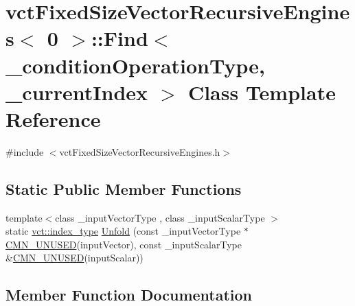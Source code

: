 \hypertarget{classvct_fixed_size_vector_recursive_engines_3_010_01_4_1_1_find}{}\section{vct\+Fixed\+Size\+Vector\+Recursive\+Engines$<$ 0 $>$\+:\+:Find$<$ \+\_\+condition\+Operation\+Type, \+\_\+current\+Index $>$ Class Template Reference}
\label{classvct_fixed_size_vector_recursive_engines_3_010_01_4_1_1_find}


{\ttfamily \#include $<$vct\+Fixed\+Size\+Vector\+Recursive\+Engines.\+h$>$}

\subsection*{Static Public Member Functions}
\begin{DoxyCompactItemize}
\item 
{\footnotesize template$<$class \+\_\+input\+Vector\+Type , class \+\_\+input\+Scalar\+Type $>$ }\\static \hyperlink{namespacevct_a50405d87494dce1f22ee3930ca285ee9}{vct\+::index\+\_\+type} \hyperlink{classvct_fixed_size_vector_recursive_engines_3_010_01_4_1_1_find_a36555789351dc612d8d924aba0640b7d}{Unfold} (const \+\_\+input\+Vector\+Type $\ast$\hyperlink{cmn_portability_8h_a021894e2626935fa2305434b1e893ff6}{C\+M\+N\+\_\+\+U\+N\+U\+S\+E\+D}(input\+Vector), const \+\_\+input\+Scalar\+Type \&\hyperlink{cmn_portability_8h_a021894e2626935fa2305434b1e893ff6}{C\+M\+N\+\_\+\+U\+N\+U\+S\+E\+D}(input\+Scalar))
\end{DoxyCompactItemize}


\subsection{Member Function Documentation}
\hypertarget{classvct_fixed_size_vector_recursive_engines_3_010_01_4_1_1_find_a36555789351dc612d8d924aba0640b7d}{}
